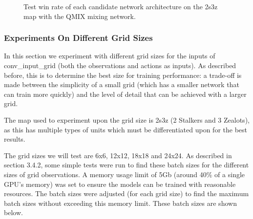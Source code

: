 \begin{figure}[!tbp]
  \centering
  \hfill
  \caption{Test win rate of each candidate network architecture on the 2s3z map with the QMIX mixing network.}
\end{figure}


\subsubsection{Experiments On Different Grid Sizes}
In this section we experiment with different grid sizes for the inputs of conv\_input\_grid (both the observations and actions as inputs). As described before, this is to determine the best size for training performance: a trade-off is made between the simplicity of a small grid (which has a smaller network that can train more quickly) and the level of detail that can be achieved with a larger grid. 

The map used to experiment upon the grid size is 2s3z (2 Stalkers and 3 Zealots), as this has multiple types of units which must be differentiated upon for the best results.



The grid sizes we will test are 6x6, 12x12, 18x18 and 24x24. As described in section 3.4.2, some simple tests were run to find these batch sizes for the different sizes of grid observations. A memory usage limit of 5Gb (around 40\% of a single GPU's memory) was set to ensure the models can be trained with reasonable resources. The batch sizes were adjusted (for each grid size) to find the maximum batch sizes without exceeding this memory limit. These batch sizes are shown below.



